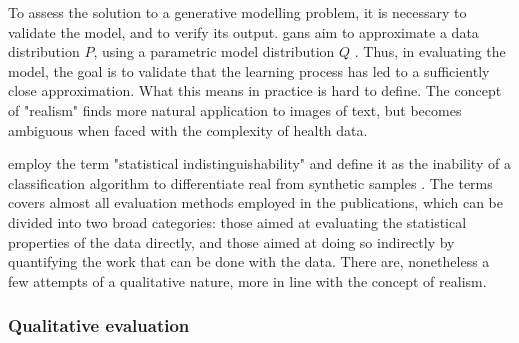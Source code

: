         To assess the solution to a generative modelling problem, it is necessary to validate the model, and to verify its output. \glspl{gan} aim to approximate a data distribution $P$, using a parametric model distribution $Q$ \cite{Borji2018-fy}. Thus, in evaluating the model, the goal is to validate that the learning process has led to a sufficiently close approximation. What this means in practice is hard to define. The concept of "realism" finds more natural application to images of text, but becomes ambiguous when faced with the complexity of health data.\par
        
        \citeauthor{walsh2020generating} employ the term "statistical indistinguishability" and define it as the inability of a classification algorithm to differentiate real from synthetic samples \cite{walsh2020generating}. The terms covers almost all evaluation methods employed in the publications, which can be divided into two broad categories: those aimed at evaluating the statistical properties of the data directly, and those aimed at doing so indirectly by quantifying the work that can be done with the data. There are, nonetheless a few attempts of a qualitative nature, more in line with the concept of realism. 

        \subsubsection{Qualitative evaluation}
        
